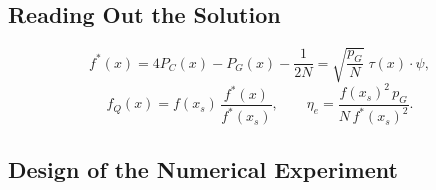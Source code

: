 \subsection{Reading Out the Solution}
\label{sec:pipeline-readout}

\begin{equation}
    f^{\ast}(x) = 4P_C(x) - P_G(x) - \frac{1}{2N} = \sqrt{\frac{p_G}{N}}\;\tau(x)\cdot\psi ,
    \label{eq:readout-identity}
\end{equation}
\begin{equation}
    f_Q(x) = f(x_s)\,\frac{f^{\ast}(x)}{f^{\ast}(x_s)},
    \qquad
    \eta_e = \frac{f(x_s)^2\,p_G}{N\,f^{\ast}(x_s)^2} .
    \label{eq:readout-field}
\end{equation}

\subsection{Design of the Numerical Experiment}
\label{sec:pipeline-design}

